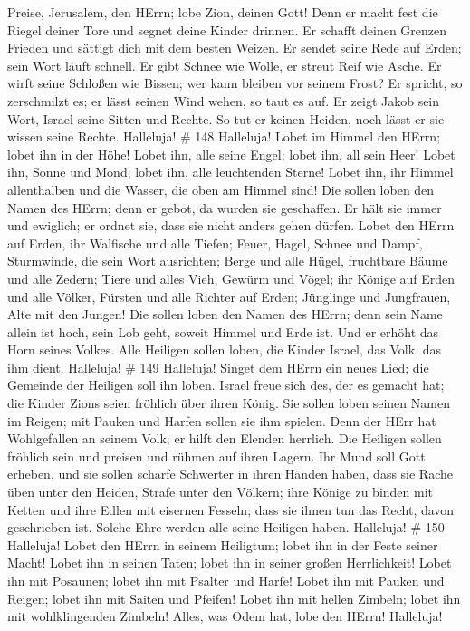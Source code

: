 Preise, Jerusalem, den HErrn; lobe Zion, deinen Gott!  Denn
er macht fest die Riegel deiner Tore und segnet deine Kinder drinnen.
 Er schafft deinen Grenzen Frieden und sättigt dich mit dem
besten Weizen.  Er sendet seine Rede auf Erden; sein Wort
läuft schnell.  Er gibt Schnee wie Wolle, er streut Reif
wie Asche.  Er wirft seine Schloßen wie Bissen; wer kann
bleiben vor seinem Frost?  Er spricht, so zerschmilzt es;
er lässt seinen Wind wehen, so taut es auf.  Er zeigt Jakob
sein Wort, Israel seine Sitten und Rechte.  So tut er
keinen Heiden, noch lässt er sie wissen seine Rechte. Halleluja! \# 148
 Halleluja! Lobet im Himmel den HErrn; lobet ihn in der
Höhe!  Lobet ihn, alle seine Engel; lobet ihn, all sein
Heer!  Lobet ihn, Sonne und Mond; lobet ihn, alle
leuchtenden Sterne!  Lobet ihn, ihr Himmel allenthalben und
die Wasser, die oben am Himmel sind!  Die sollen loben den
Namen des HErrn; denn er gebot, da wurden sie geschaffen. 
Er hält sie immer und ewiglich; er ordnet sie, dass sie nicht anders
gehen dürfen.  Lobet den HErrn auf Erden, ihr Walfische und
alle Tiefen;  Feuer, Hagel, Schnee und Dampf, Sturmwinde,
die sein Wort ausrichten;  Berge und alle Hügel, fruchtbare
Bäume und alle Zedern;  Tiere und alles Vieh, Gewürm und
Vögel;  ihr Könige auf Erden und alle Völker, Fürsten und
alle Richter auf Erden;  Jünglinge und Jungfrauen, Alte mit
den Jungen!  Die sollen loben den Namen des HErrn; denn
sein Name allein ist hoch, sein Lob geht, soweit Himmel und Erde ist.
 Und er erhöht das Horn seines Volkes. Alle Heiligen sollen
loben, die Kinder Israel, das Volk, das ihm dient. Halleluja! \# 149
 Halleluja! Singet dem HErrn ein neues Lied; die Gemeinde
der Heiligen soll ihn loben.  Israel freue sich des, der es
gemacht hat; die Kinder Zions seien fröhlich über ihren König.
 Sie sollen loben seinen Namen im Reigen; mit Pauken und
Harfen sollen sie ihm spielen.  Denn der HErr hat
Wohlgefallen an seinem Volk; er hilft den Elenden herrlich. 
Die Heiligen sollen fröhlich sein und preisen und rühmen auf ihren
Lagern.  Ihr Mund soll Gott erheben, und sie sollen scharfe
Schwerter in ihren Händen haben,  dass sie Rache üben unter
den Heiden, Strafe unter den Völkern;  ihre Könige zu binden
mit Ketten und ihre Edlen mit eisernen Fesseln;  dass sie
ihnen tun das Recht, davon geschrieben ist. Solche Ehre werden alle
seine Heiligen haben. Halleluja! \# 150  Halleluja! Lobet
den HErrn in seinem Heiligtum; lobet ihn in der Feste seiner Macht!
 Lobet ihn in seinen Taten; lobet ihn in seiner großen
Herrlichkeit!  Lobet ihn mit Posaunen; lobet ihn mit Psalter
und Harfe!  Lobet ihn mit Pauken und Reigen; lobet ihn mit
Saiten und Pfeifen!  Lobet ihn mit hellen Zimbeln; lobet ihn
mit wohlklingenden Zimbeln!  Alles, was Odem hat, lobe den
HErrn! Halleluja!
